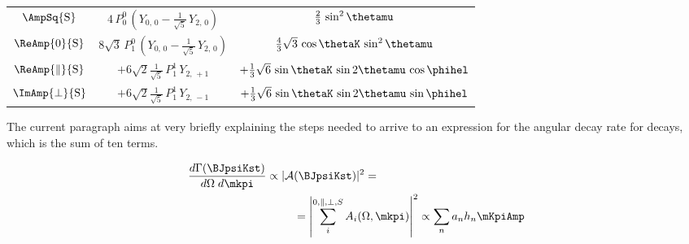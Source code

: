 \begin{table}[!h]
\begin{tabular}{ccc}
    \hline
    $\AmpSq{{\text{S}}}$  &
      $4\, P_0^0\, (Y_{0,\,0} - \tfrac{1}{\sqrt{5}}\, Y_{2,\,0})$  &
      $\tfrac{2}{3}\, \sin^2\thetamu$  \\

    $\ReAmp{0}{{\text{S}}}$  &
      $8\sqrt{3}\, P_1^0\, (Y_{0,\,0} - \tfrac{1}{\sqrt{5}}\, Y_{2,\,0})$  &
      $\tfrac{4}{3}\sqrt{3}\, \cos\thetaK\, \sin^2\thetamu$  \\

    $\ReAmp{\parallel}{{\text{S}}}$  &
      $+6\sqrt{2}\tfrac{1}{\sqrt{5}}\, P_1^1\, Y_{2,\,+1}$  &
      $+\tfrac{1}{3}\sqrt{6}\, \sin\thetaK\, \sin2\thetamu\, \cos\phihel$  \\

    $\ImAmp{\perp}{{\text{S}}}$  &
      $+6\sqrt{2}\tfrac{1}{\sqrt{5}}\, P_1^1\, Y_{2,\,-1}$  &
      $+\tfrac{1}{3}\sqrt{6}\, \sin\thetaK\, \sin2\thetamu\, \sin\phihel$  \\
    \hline
  \end{tabular}
\end{table}  
 
The current paragraph aims at very briefly explaining the steps needed to arrive to an expression for the angular decay rate for \BsJpsiKst decays, which is the sum of ten terms.  

\begin{align}
  \frac{d\Gamma(\text{\BJpsiKst})}{d\Omega\;d\mkpi} \propto |\mathcal{A}&(\text{\BJpsiKst})|^2 = \nonumber \\
                                                    &= \left| \sum_i^{0,\parallel,\perp,S} A_i(\Omega,\mkpi) \right|^2  \propto \sum_n a_n h_n \mKpiAmp
  \label{ang_terms}
\end{align}

